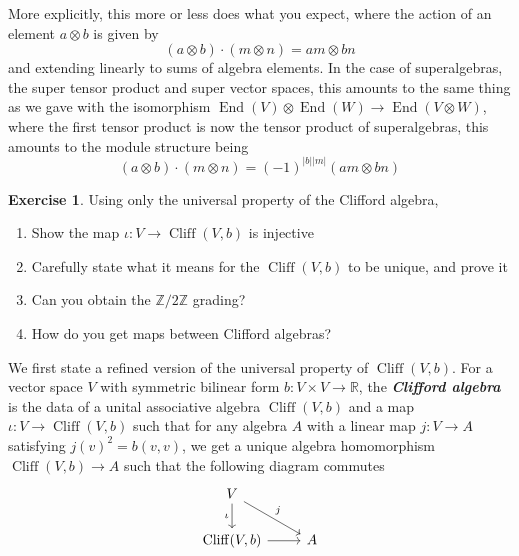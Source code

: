 \documentclass[psamsfonts]{amsart}
\theoremstyle{definition}
\newtheorem{exer}[thm]{Exercise}
\theoremstyle{remark}
\newcommand{\R}{\mathbb{R}}
\newcommand{\ib}[1]{\textbf{\textit{#1}}}
\newcommand{\Z}{\mathbb{Z}}
\DeclareMathOperator{\End}{End}
\DeclareMathOperator{\Cliff}{Cliff}
\begin{document}
More explicitly, this more or less does what you expect, where the action of an element $a \otimes b$ is given by
$$(a\otimes b) \cdot (m \otimes n) = am \otimes bn $$
and extending linearly to sums of algebra elements.
In the case of superalgebras, the super tensor product and super vector spaces, this amounts to the same thing as we gave with the isomorphism $\End(V) \otimes \End(W) \to \End(V \otimes W)$, where the first tensor product is now the tensor product of superalgebras, this amounts to the module structure being
$$(a \otimes b) \cdot (m \otimes n) = (-1)^{|b||m|}(am \otimes bn) $$
%
\begin{exer}
Using only the universal property of the Clifford algebra,
\begin{enumerate}
\item Show the map $\iota : V \to \Cliff(V,b)$ is injective
\item Carefully state what it means for the $\Cliff(V,b)$ to be unique, and prove it
\item Can you obtain the $\Z/2\Z$ grading?
\item How do you get maps between Clifford algebras?
\end{enumerate}
\end{exer}
We first state a refined version of the universal property of $\Cliff(V,b)$. For a vector space $V$ with symmetric bilinear form $b : V \times V \to \R$, the \ib{Clifford algebra} is the data of a unital associative algebra $\Cliff(V,b)$ and a map $\iota : V \to \Cliff(V,b)$ such that for any algebra $A$ with a linear map $j : V \to A$ satisfying $j(v)^2 = b(v,v)$, we get a unique algebra homomorphism $\Cliff(V,b) \to A$ such that the following diagram commutes 
$$\begin{tikzcd}
V \arrow[d, "\iota"'] \arrow[dr, "j"]\\
\Cliff(V,b) \arrow[r] & A
\end{tikzcd}$$
\end{document}
